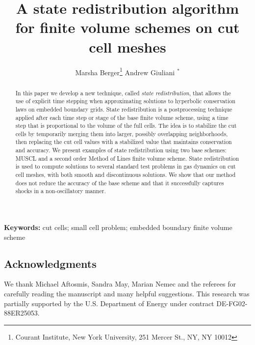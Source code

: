 \documentclass[12pt]{article}
\newcommand{\keywords}[1]{\textbf{Keywords: } #1}
\begin{document}
\date{}

\title{A state redistribution algorithm for finite volume schemes
on cut cell meshes}
\author{Marsha Berger\footnote{Courant Institute, New York University, 251 Mercer St.,
NY, NY 10012}  \hspace{1in} Andrew Giuliani $^*$}

\maketitle

\begin{abstract}
In this paper we develop a new technique, called \textit{state redistribution}, 
that allows the use of explicit time stepping when approximating
solutions to hyperbolic conservation laws on embedded boundary grids.  
State redistribution is a postprocessing technique applied after each time 
step or stage of the base finite volume scheme, using a time step
that is proportional to the volume of the full cells.  The idea is to 
stabilize the cut cells by temporarily merging them into larger, 
possibly overlapping neighborhoods, 
then replacing the cut cell values with a stabilized value
that maintains conservation and accuracy.
We present examples of state redistribution using two base schemes:
MUSCL and a second order Method of Lines finite volume scheme. 
State redistribution is used to compute solutions to several 
standard test problems in gas dynamics on cut cell meshes, with both
smooth and discontinuous solutions. We show that our method does not 
reduce the accuracy of the base scheme and 
that it successfully captures shocks in a non-oscillatory manner.
\end{abstract}

\keywords{cut cells; small cell problem; embedded boundary finite volume scheme}










\small
\subsection*{Acknowledgments} 
We thank Michael Aftosmis, Sandra May, Marian Nemec and the referees 
for carefully reading the manuscript and many helpful suggestions.
This research was partially supported by the U.S. Department of
Energy under contract DE-FG02-88ER25053.





\end{document}

